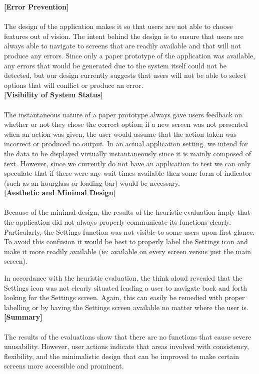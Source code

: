\documentclass[pdftex,12pt,a4paper]{report}
\begin{document}
\noindent\textbf{[Error Prevention]}\\\\
The design of the application makes it so that users are not able to choose features out of vision. The intent behind the design is to ensure that users are always able to navigate to screens that are readily available and that will not produce any errors. Since only a paper prototype of the application was available, any errors that would be generated due to the system itself could not be detected, but our design currently suggests that users will not be able to select options that will conflict or produce an error.\\

\noindent\textbf{[Visibility of System Status]}\\\\
The instantaneous nature of a paper prototype always gave users feedback on whether or not they chose the correct option; if a new screen was not presented when an action was given, the user would assume that the action taken was incorrect or produced no output. In an actual application setting, we intend for the data to be displayed virtually instantaneously since it is mainly composed of text. However, since we currently do not have an application to test we can only speculate that if there were any wait times available then some form of indicator (such as an hourglass or loading bar) would be necessary.\\

\noindent\textbf{[Aesthetic and Minimal Design]}\\\\
Because of the minimal design, the results of the heuristic evaluation imply that the application did not always properly communicate its functions clearly. Particularly, the Settings function was not visible to some users upon first glance. To avoid this confusion it would be best to properly label the Settings icon and make it more readily available (ie: available on every screen versus just the main screen).

In accordance with the heuristic evaluation, the think aloud revealed that the Settings icon was not clearly situated leading a user to navigate back and forth looking for the Settings screen. Again, this can easily be remedied with proper labelling or by having the Settings screen available no matter where the user is.\\

\noindent\textbf{[Summary]}\\\\
The results of the evaluations show that there are no functions that cause severe unusability. However, user actions indicate that areas involved with consistency, flexibility, and the minimalistic design that can be improved to make certain screens more accessible and prominent.
\end{document}
